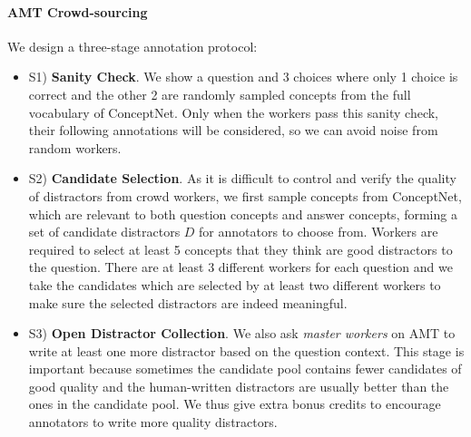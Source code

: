 \paragraph{AMT Crowd-sourcing}
We design a three-stage annotation protocol:

\begin{itemize} 
    \item S1) {\textbf{Sanity Check}}. We show a question and 3 choices where only 1 choice is correct and the other 2 are randomly sampled concepts from the full vocabulary of ConceptNet. 
    Only when the workers pass this sanity check, their following annotations will be considered, so we 
    can avoid noise from random workers.
    
    \item S2) \textbf{Candidate Selection}. As it is difficult to control and verify the quality of distractors from crowd workers, 
we first sample concepts from ConceptNet, which are relevant to both question concepts and answer concepts, forming a set of candidate distractors $D$ for annotators to choose from.
Workers are required to select at least 5 concepts that they think are good distractors to the question. There are at least 3 different workers for each question and we take the candidates which are selected by at least two different workers to make sure the selected distractors are indeed meaningful.
    
    \item S3) \textbf{Open Distractor Collection}. 
    We also ask \textit{master workers} on AMT to write at least one more distractor based on the question context.
    This stage is important because sometimes the candidate pool contains fewer candidates of good quality and the human-written distractors are usually better than the ones in the candidate pool.
    We thus give extra bonus credits to encourage annotators to write more quality distractors.
\end{itemize}

